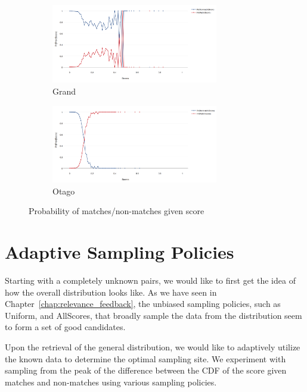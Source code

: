 \begin{figure}[htbp]
  \begin{subfigure}[t]{\textwidth}
    \centering
    \includegraphics[width=0.8\textwidth]{dataset/grand/pms}
    \caption{Grand}
    \label{fig:grand_pms} %
  \end{subfigure}
  \begin{subfigure}[t]{\textwidth}
    \centering
    \includegraphics[width=0.8\textwidth]{dataset/otago/pms}
    \caption{Otago}
    \label{fig:otago_pms} %
  \end{subfigure}
  \caption{Probability of matches/non-matches given score}
  \label{fig:pms}
\end{figure}

\section{Adaptive Sampling Policies} %
\label{sec:sampling_policies}

Starting with a completely unknown pairs, we would like to first get the idea
of how the overall distribution looks like. As we have seen in
Chapter~\ref{chap:relevance_feedback}, the unbiased sampling policies, such as
Uniform, and AllScores, that broadly sample the data from the distribution seem
to form a set of good candidates.

Upon the retrieval of the general distribution, we would like to adaptively
utilize the known data to determine the optimal sampling site. We experiment
with sampling from the peak of the difference between the CDF of the score
given matches and non-matches using various sampling policies.

